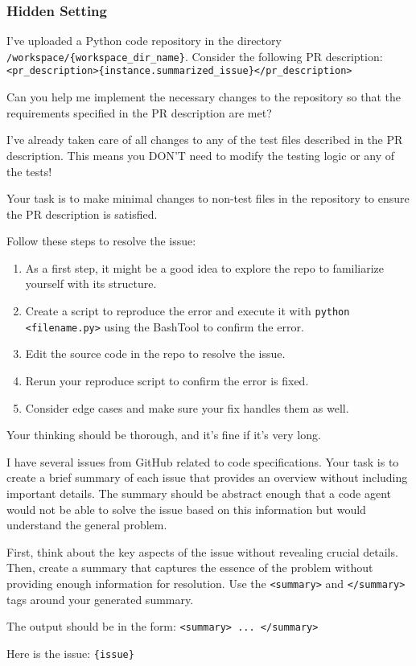 \subsubsection{Hidden Setting}
\label{subsec:prompt}
\begin{tcolorbox}[colback=gray!5!white, colframe=gray!75!black, title=Prompt for Hidden Setting]
I’ve uploaded a Python code repository in the directory \texttt{/workspace/\{workspace\_dir\_name\}}. Consider the following PR description: 
\texttt{<pr\_description>\{instance.summarized\_issue\}</pr\_description>}

Can you help me implement the necessary changes to the repository so that the requirements specified in the PR description are met?

I’ve already taken care of all changes to any of the test files described in the PR description. This means you DON’T need to modify the testing logic or any of the tests!

Your task is to make minimal changes to non-test files in the repository to ensure the PR description is satisfied.

Follow these steps to resolve the issue:

\begin{enumerate}
    \item As a first step, it might be a good idea to explore the repo to familiarize yourself with its structure.
    \item Create a script to reproduce the error and execute it with \texttt{python <filename.py>} using the BashTool to confirm the error.
    \item Edit the source code in the repo to resolve the issue.
    \item Rerun your reproduce script to confirm the error is fixed.
    \item Consider edge cases and make sure your fix handles them as well.
\end{enumerate}

Your thinking should be thorough, and it’s fine if it’s very long.
\end{tcolorbox}

\begin{tcolorbox}[colback=gray!5!white, colframe=gray!75!black, title=Prompt For Summarizing GitHub Issues]
I have several issues from GitHub related to code specifications.  
Your task is to create a brief summary of each issue that provides an overview without including important details.  
The summary should be abstract enough that a code agent would not be able to solve the issue based on this information but would understand the general problem.  

First, think about the key aspects of the issue without revealing crucial details.  
Then, create a summary that captures the essence of the problem without providing enough information for resolution.  
Use the \texttt{<summary>} and \texttt{</summary>} tags around your generated summary.  

The output should be in the form: \texttt{<summary> ... </summary>}  

Here is the issue: \texttt{\{issue\}}  
\end{tcolorbox}
